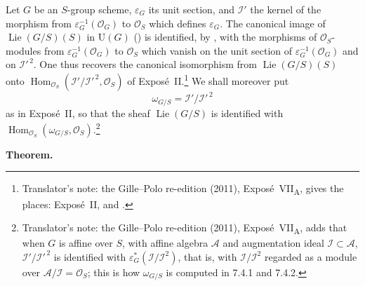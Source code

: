 Let \(G\) be an \(S\)-group scheme, \(\varepsilon_G\) its unit section,
and \(\mathcal I'\) the kernel of the morphism from
\(\varepsilon_G^{-1}(\mathcal O_G)\) to \(\mathcal O_S\) which defines
\(\varepsilon_G\). The canonical image of
\(\operatorname{Lie}(G/S)(S)\) in \(\mathrm U(G)\) () is
identified, by , with the morphisms of \(\mathcal O_S\)-modules
from \(\varepsilon_G^{-1}(\mathcal O_G)\) to \(\mathcal O_S\) which vanish
on the unit section of \(\varepsilon_G^{-1}(\mathcal O_G)\) and on
\(\mathcal I'^{\,2}\). One thus recovers the canonical isomorphism from
\(\operatorname{Lie}(G/S)(S)\) onto
\(\operatorname{Hom}_{\mathcal O_S}(\mathcal I'/\mathcal I'^{\,2},\mathcal O_S)\)
of Expos\'e~II.\footnote{Translator's note: the Gille--Polo re-edition
(2011), Expos\'e~VII\textsubscript{A}, gives the places: Expos\'e~II,
 and .} We shall moreover put
\[
  \omega_{G/S}=\mathcal I'/\mathcal I'^{\,2}
\]
as in Expos\'e~II, so that the sheaf \(\operatorname{Lie}(G/S)\) is
identified with
\(\operatorname{Hom}_{\mathcal O_S}(\omega_{G/S},\mathcal O_S)\).\footnote{Translator's
note: the Gille--Polo re-edition (2011), Expos\'e~VII\textsubscript{A},
adds that when \(G\) is affine over \(S\), with affine algebra
\(\mathcal A\) and augmentation ideal \(\mathcal I\subset\mathcal A\),
\(\mathcal I'/\mathcal I'^{\,2}\) is identified with
\(\varepsilon_G^{*}(\mathcal I/\mathcal I^2)\), that is, with
\(\mathcal I/\mathcal I^2\) regarded as a module over
\(\mathcal A/\mathcal I=\mathcal O_S\); this is how \(\omega_{G/S}\) is
computed in 7.4.1 and 7.4.2.}

\medskip
\noindent\textbf{Theorem.}
\label{sga3:VIIA:7.4-theorem}

